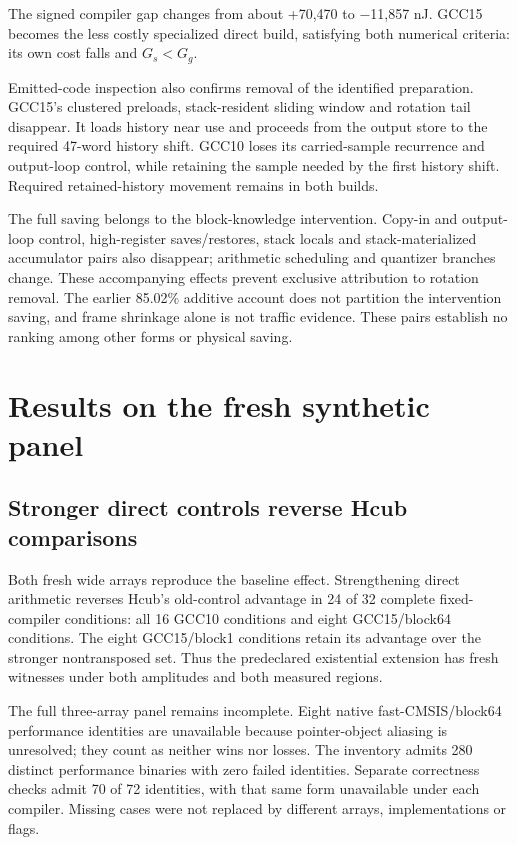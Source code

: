 \documentclass[conference]{IEEEtran}
\begin{document}
The signed compiler gap changes from about +70,470 to −11,857 nJ. GCC15
becomes the less costly specialized direct build, satisfying both
numerical criteria: its own cost falls and \(G_s<G_g\).

Emitted-code inspection also confirms removal of the identified
preparation. GCC15's clustered preloads, stack-resident sliding window
and rotation tail disappear. It loads history near use and proceeds from
the output store to the required 47-word history shift. GCC10 loses its
carried-sample recurrence and output-loop control, while retaining the
sample needed by the first history shift. Required retained-history
movement remains in both builds.

The full saving belongs to the block-knowledge intervention. Copy-in and
output-loop control, high-register saves/restores, stack locals and
stack-materialized accumulator pairs also disappear; arithmetic
scheduling and quantizer branches change. These accompanying effects
prevent exclusive attribution to rotation removal. The earlier 85.02\%
additive account does not partition the intervention saving, and frame
shrinkage alone is not traffic evidence. These pairs establish no
ranking among other forms or physical saving.

\FloatBarrier

\section{Results on the fresh synthetic panel}\label{results-on-the-fresh-synthetic-panel}

\subsection{Stronger direct controls reverse Hcub comparisons}\label{stronger-direct-controls-reverse-hcub-comparisons}

Both fresh wide arrays reproduce the baseline effect. Strengthening
direct arithmetic reverses Hcub's old-control advantage in 24 of 32
complete fixed-compiler conditions: all 16 GCC10 conditions and eight
GCC15/block64 conditions. The eight GCC15/block1 conditions retain its
advantage over the stronger nontransposed set. Thus the predeclared
existential extension has fresh witnesses under both amplitudes and both
measured regions.

The full three-array panel remains incomplete. Eight native
fast-CMSIS/block64 performance identities are unavailable because
pointer-object aliasing is unresolved; they count as neither wins nor
losses. The inventory admits 280 distinct performance binaries with zero
failed identities. Separate correctness checks admit 70 of 72
identities, with that same form unavailable under each compiler. Missing
cases were not replaced by different arrays, implementations or flags.
\end{document}

